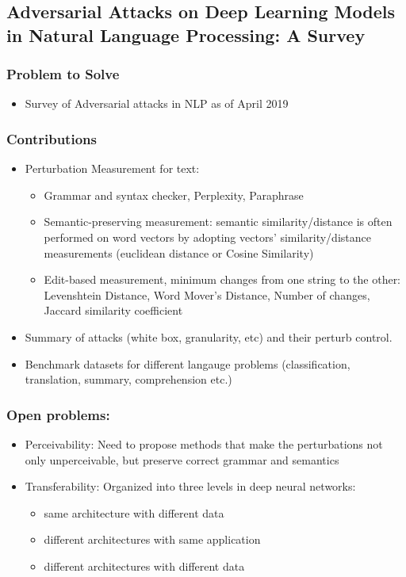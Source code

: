 \documentclass{article}
\begin{document}
\begin{flushleft}
\subsection{Adversarial Attacks on Deep Learning Models in Natural Language Processing: A Survey \cite{zhang2020adversarial}} 
\subsubsection*{Problem to Solve}
\begin{itemize}
    \item Survey of Adversarial attacks in NLP as of April 2019 
\end{itemize}

\subsubsection*{Contributions}
\begin{itemize}
  \item Perturbation Measurement for text: 
  \begin{itemize}
  \item Grammar and syntax checker, Perplexity, Paraphrase
  \item Semantic-preserving measurement: semantic similarity/distance is often performed on word vectors by adopting vectors’ similarity/distance measurements (euclidean distance or Cosine Similarity)
  \item Edit-based measurement, minimum changes from one string to the other: Levenshtein Distance, Word Mover’s Distance, Number of changes, Jaccard similarity coefficient
  \end{itemize}
  \item Summary of attacks (white box, granularity, etc) and their perturb control. 
  \item Benchmark datasets for different langauge problems (classification, translation, summary, comprehension etc.)
\end{itemize}

\subsubsection*{Open problems:}
\begin{itemize}
  \item Perceivability: Need to propose methods that make the perturbations not only unperceivable, but preserve correct grammar and semantics
  \item Transferability: Organized into three levels in deep neural networks: 
  \begin{itemize}
      \item same architecture with different data
      \item different architectures with same application
      \item different architectures with different data
  \end{itemize}
\end{itemize}






\end{flushleft}
\end{document}
